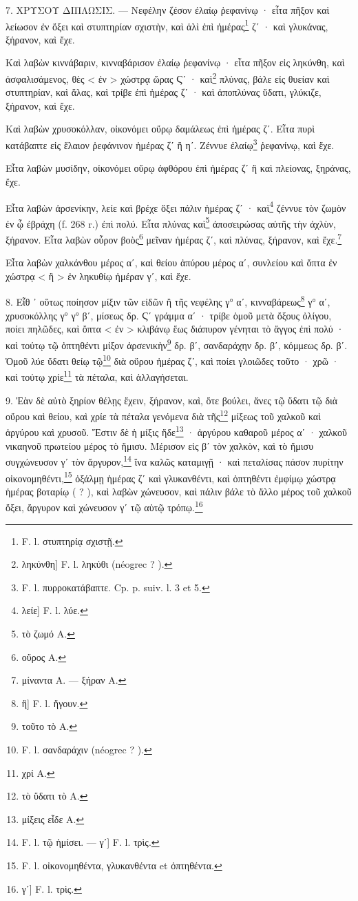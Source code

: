 \documentclass[a4paper, 11pt, oneside, polutonikogreek, french]{article}
\begin{document}
7. ΧΡΥΣΟΥ ΔΙΠΛΩΣΙΣ. --- Νεφέλην ζέσον ἐλαίῳ ῥεφανίνῳ · εἶτα πῆξον καὶ λείωσον ἐν ὄξει καὶ στυπτηρίαν σχιστὴν, καὶ ἁλὶ ἐπὶ ἡμέρας\footnote{F. l. στυπτηρίᾳ σχιστῇ.} ζʹ · καὶ γλυκάνας, ξήρανον, καὶ ἔχε.

Καὶ λαβὼν κιννάβαριν, κινναβάρισον ἐλαίῳ ῥεφανίνῳ · εἶτα πῆξον εἰς ληκύνθη, καὶ ἀσφαλισάμενος, θὲς < ἐν > χώστρᾳ ὥρας Ϛʹ · καὶ\footnote{ληκύνθη] F. l. ληκύθι (néogrec ? ).} πλύνας, βάλε εἰς θυείαν καὶ στυπτηρίαν, καὶ ἅλας, καὶ τρίβε ἐπὶ ἡμέρας ζʹ · καὶ ἀποπλύνας ὕδατι, γλύκιζε, ξήρανον, καὶ ἔχε.

Καὶ λαβὼν χρυσοκόλλαν, οἰκονόμει οὔρῳ δαμάλεως ἐπὶ ἡμέρας ζʹ. Εἶτα πυρὶ κατάβαπτε εἰς ἔλαιον ῥεφάνινον ἡμέρας ζʹ ἢ ηʹ. Ζέννυε ἐλαίῳ\footnote{F. l. πυρροκατάβαπτε. Cp. p. suiv. l. 3 et 5.} ῥεφανίνῳ, καὶ ἔχε.

Εἶτα λαβὼν μυσίδην, οἰκονόμει οὔρῳ ἀφθόρου ἐπὶ ἡμέρας ζʹ ἢ καὶ πλείονας, ξηράνας, ἔχε.

Εἶτα λαβὼν ἀρσενίκην, λείε καὶ βρέχε ὄξει πάλιν ἡμέρας ζʹ · καὶ\footnote{λείε] F. l. λύε.} ζέννυε τὸν ζωμὸν ἐν ᾧ ἐβράχη (f. 268 r.) ἐπὶ πολύ. Εἶτα πλύνας καὶ\footnote{τὸ ζωμό A.} ἀποσειρώσας αὐτῆς τὴν ἀχλὺν, ξήρανον. Εἶτα λαβὼν οὖρον βοὸς\footnote{οὔρος A.} μεῖναν ἡμέρας ζʹ, καὶ πλύνας, ξήρανον, καὶ ἔχε.\footnote{μίναντα A. --- ξήραν A.}

Εἶτα λαβὼν χαλκάνθου μέρος αʹ, καὶ θείου ἀπύρου μέρος αʹ, συνλείου καὶ ὄπτα ἐν χώστρᾳ < ἢ > ἐν ληκυθίῳ ἡμέραν γʹ, καὶ ἔχε.

8. Εἶθ ᾽ οὕτως ποίησον μίξιν τῶν εἰδῶν ἢ τῆς νεφέλης γ° αʹ, κινναβάρεως\footnote{ἢ] F. l. ἤγουν.} γ° αʹ, χρυσοκόλλης γ° γ° βʹ, μίσεως δρ. Ϛʹ γράμμα αʹ · τρίβε ὁμοῦ μετὰ ὄξους ὀλίγου, ποίει πηλῶδες, καὶ ὄπτα < ἐν > κλιβάνῳ ἕως διάπυρον γένηται τὸ ἄγγος ἐπὶ πολύ · καὶ τούτῳ τῷ ὀπτηθέντι μίξον ἀρσενικὴν\footnote{τοῦτο τὸ A.} δρ. βʹ, σανδαράχην δρ. βʹ, κόμμεως δρ. βʹ. Ὁμοῦ λύε ὕδατι θείῳ τῷ\footnote{F. l. σανδαράχιν (néogrec ? ).} διὰ οὔρου ἡμέρας ζʹ, καὶ ποίει γλοιῶδες τοῦτο · χρῶ · καὶ τούτῳ χρίε\footnote{χρί A.} τὰ πέταλα, καὶ ἀλλαγήσεται.

9. Ἐὰν δὲ αὐτὸ ξηρίον θέλῃς ἔχειν, ξήρανον, καὶ, ὅτε βούλει, ἄνες τῷ ὕδατι τῷ διὰ οὔρου καὶ θείου, καὶ χρίε τὰ πέταλα γενόμενα διὰ τῆς\footnote{τὸ ὕδατι τὸ A.} μίξεως τοῦ χαλκοῦ καὶ ἀργύρου καὶ χρυσοῦ. Ἔστιν δὲ ἡ μίξις ἥδε\footnote{μίξεις εἶδε A.} · ἀργύρου καθαροῦ μέρος αʹ · χαλκοῦ νικαηνοῦ πρωτείου μέρος τὸ ἥμισυ. Μέρισον εἰς βʹ τὸν χαλκὸν, καὶ τὸ ἥμισυ συγχώνευσον γʹ τὸν ἄργυρον,\footnote{F. l. τῷ ἡμίσει. --- γʹ] F. l. τρὶς.} ἵνα καλῶς καταμιγῇ · καὶ πεταλίσας πάσον πυρίτην οἰκονομηθέντι,\footnote{F. l. οἰκονομηθέντα, γλυκανθέντα et ὀπτηθέντα.} ὀξάλμῃ ἡμέρας ζʹ καὶ γλυκανθέντι, καὶ ὀπτηθέντι ἐμφίμῳ χώστρᾳ ἡμέρας βοταρίῳ ( ? ), καὶ λαβὼν χώνευσον, καὶ πάλιν βάλε τὸ ἄλλο μέρος τοῦ χαλκοῦ ὄξει, ἄργυρον καὶ χώνευσον γʹ τῷ αὐτῷ τρόπῳ.\footnote{γʹ] F. l. τρὶς.}
\end{document}
